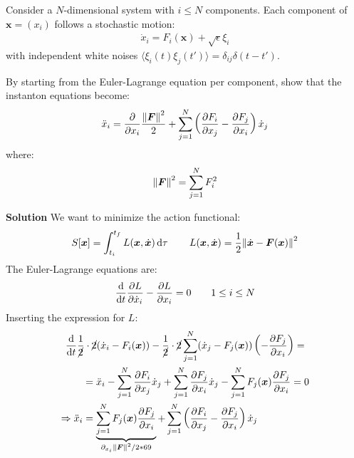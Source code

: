 \documentclass[../template.tex]{subfiles}
\begin{document}
\begin{exo}
    Consider a $N$-dimensional system with $i \leq N$ components. Each component of $\bm{x} = (x_i)$ follows a stochastic motion:
    \begin{align*}
        \dot{x}_i = F_i(\bm{x}) + \sqrt{\epsilon} \xi_i
    \end{align*}
    with independent white noises $\langle \xi_i(t) \xi_j (t')\rangle = \delta_{ij} \delta(t-t')$.

    By starting from the Euler-Lagrange equation per component, show that the instanton equations become:
    \begin{align} \label{eqn:instantons}
        \ddot{x}_i = \pdv{x_i} \frac{\norm{\bm{F}}^2}{2} + \sum_{j=1}^N \left(\pdv{F_i}{x_j} - \pdv{F_j}{x_i}\right)  \dot{x}_j
    \end{align}
    where:
    \begin{align*}
        \norm{\bm{F}}^2 = \sum_{j=1}^N F_i^2
    \end{align*}

    \medskip

    \textbf{Solution} We want to minimize the action functional:
    \begin{align*}
        S[\bm{x}] = \int_{t_i}^{t_f} L(\bm{x}, \dot{\bm{x}}) \dd{\tau} \qquad L(\bm{x}, \dot{\bm{x}}) = \frac{1}{2} \norm{\dot{\bm{x}} - \bm{F}(\bm{x})}^2  
    \end{align*} 
    The Euler-Lagrange equations are:
    \begin{align*}
        \dv{t} \pdv{L}{\dot{x}_i} - \pdv{L}{x_i} = 0 \qquad 1 \leq i \leq N
    \end{align*}
    Inserting the expression for $L$:
    \begin{align} \nonumber
        \dv{t} \frac{1}{\cancel{2}} \cdot \cancel{2 }(\dot{x}_i - F_i(\bm{x})) - \frac{1}{\cancel{2}}\cdot\cancel{ 2} \sum_{j=1}^N (\dot{x}_j - F_j(\bm{x})) \left(- \pdv{F_j}{x_i} (\bm{x})\right) = \span \\ \nonumber
        &=\ddot{x}_i - \sum_{j=1}^N \pdv{F_i}{x_j} (\bm{x}) \dot{x}_j + \sum_{j=1}^N \pdv{F_j}{x_i} (\bm{x}) \dot{x}_j - \sum_{j=1}^N F_j(\bm{x}) \pdv{F_j}{x_i} (\bm{x}) = 0\\ 
        \Rightarrow \ddot{x}_i &=  \underbrace{\sum_{j=1}^N F_j(\bm{x}) \pdv{F_j}{x_i} (\bm{x}) }_{\partial_{x_i} \norm{\bm{F}}^2/2*69}+ \sum_{j=1}^N \left( \pdv{F_i}{x_j} (\bm{x}) - \pdv{F_j}{x_i} (\bm{x}) \right) \dot{x}_j 
        \label{eqn:full-form}
    \end{align}
\end{exo}
\end{document}
